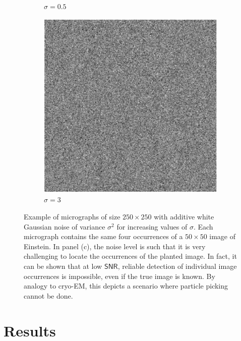 \documentclass[english,11pt]{article}
\newcommand{\1}{\mathbf{1}}
\newcommand{\TODO}[1]{{\color{red}{[#1]}}}
\numberwithin{equation}{section}
\theoremstyle{plain}
\theoremstyle{definition}
\theoremstyle{remark}
\theoremstyle{plain}
\theoremstyle{remark}
\theoremstyle{plain}
\theoremstyle{plain}
\newcommand{\SNR}{\ensuremath{\textsf{SNR}}}
\begin{document}
\begin{figure}[t]
\begin{subfigure}[h]{0.33\textwidth}
		\caption{$\sigma = 0.5$}
	\end{subfigure}
	\begin{subfigure}[h]{0.33\textwidth}
		\centering
		\includegraphics[scale=0.5]{micrograph_Einstein_example_s3}
		\caption{$\sigma = 3$}
	\end{subfigure}
	\caption{\label{fig:micro_example} Example of micrographs of size $250\times 250$ with additive white Gaussian noise of variance $\sigma^2$ for increasing values of $\sigma$. Each micrograph contains the same four occurrences of a $50 \times 50$ image of Einstein. In panel (c), the noise level is such that it is very challenging to locate the occurrences of the planted image. In fact, it can be shown that at low $\SNR$, reliable detection of individual image occurrences is impossible, even if the true image is known. By analogy to cryo-EM, this depicts a scenario where particle picking cannot be done. \TODO{Do we want to replace with a cryo-EM figure?}}	
\end{figure}


\section{Results} \label{sec:results}
\end{document}
